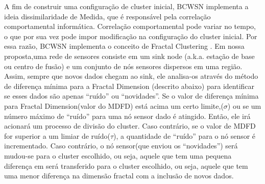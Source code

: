 \documentclass{acm_proc_article-sp}
\begin{document}



A fim de construir uma configuração de cluster inicial, BCWSN implementa
a ideia dissimilaridade de Medida, que é responsável pela correlação
comportamental informática. Correlação comportamental pode variar no tempo,
o que por sua vez pode impor modificação na configuração do cluster inicial.
Por essa razão, BCWSN implementa o conceito de Fractal Clustering
\cite{Barbara2000}. Em nossa proposta,uma rede de sensores consiste
em um sink node (a.k.a. estação de base ou centro de fusão) e um conjunto
de nós sensores dispersos em uma região.
Assim, sempre que novos dados chegam ao sink, ele analisa-os através do método
de diferença mínima para a Fractal Dimension (descrito abaixo) para
identificar se esses dados são apenas ``ruído'' ou ``novidades''. 
Se o valor de diferença mínima para Fractal Dimension(valor do MDFD)
está acima um certo limite,($\sigma$) ou se um número máximo de ``ruído'' 
para uma nó sensor dado é atingido. Então, ele irá acionará um processo de
divisão do cluster. Caso contrário, se o valor de MDFD for superior a um 
limiar de ruído($\tau$), a quantidade de ``ruído'' para o nó sensor é 
incrementado. Caso contrário, o nó sensor(que enviou os ``novidades'')
será mudou-se para o cluster escolhido, ou seja, aquele que tem uma pequena
diferença em será transferido para o cluster escolhido, ou seja, aquele que
tem uma menor diferença na dimensão fractal com a inclusão de novos dados.
\vspace*{-.3cm}
\end{document}
